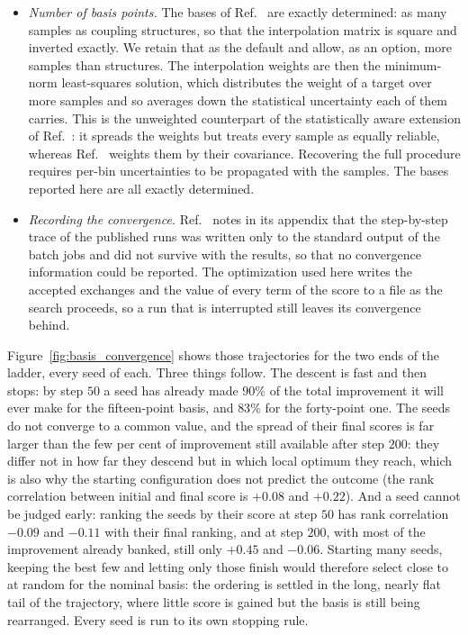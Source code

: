 \begin{itemize}
  \item \emph{Number of basis points.} The bases of Ref.~\cite{HH_nonggf_R5} are exactly determined: as many samples as coupling structures, so that the interpolation matrix is square and inverted exactly. We retain that as the default and allow, as an option, more samples than structures. The interpolation weights are then the minimum-norm least-squares solution, which distributes the weight of a target over more samples and so averages down the statistical uncertainty each of them carries. This is the unweighted counterpart of the statistically aware extension of Ref.~\cite{HHMatrix_R5}: it spreads the weights but treats every sample as equally reliable, whereas Ref.~\cite{HHMatrix_R5} weights them by their covariance. Recovering the full procedure requires per-bin uncertainties to be propagated with the samples. The bases reported here are all exactly determined.
  \item \emph{Recording the convergence.} Ref.~\cite{HH_nonggf_R5} notes in its appendix that the step-by-step trace of the published runs was written only to the standard output of the batch jobs and did not survive with the results, so that no convergence information could be reported. The optimization used here writes the accepted exchanges and the value of every term of the score to a file as the search proceeds, so a run that is interrupted still leaves its convergence behind.
\end{itemize}

Figure~\ref{fig:basis_convergence} shows those trajectories for the two ends of the
ladder, every seed of each. Three things follow. The descent is fast and then stops: by
step $50$ a seed has already made $90\%$ of the total improvement it will ever make for
the fifteen-point basis, and $83\%$ for the forty-point one. The seeds do not converge
to a common value, and the spread of their final scores is far larger than the few per
cent of improvement still available after step $200$: they differ not in how far they
descend but in which local optimum they reach, which is also why the starting
configuration does not predict the outcome (the rank correlation between initial and
final score is $+0.08$ and $+0.22$). And a seed cannot be judged early: ranking the
seeds by their score at step $50$ has rank correlation $-0.09$ and $-0.11$ with their
final ranking, and at step $200$, with most of the improvement already banked, still
only $+0.45$ and $-0.06$. Starting many seeds, keeping the best few and letting only
those finish would therefore select close to at random for the nominal basis: the
ordering is settled in the long, nearly flat tail of the trajectory, where little score
is gained but the basis is still being rearranged. Every seed is run to its own
stopping rule.

